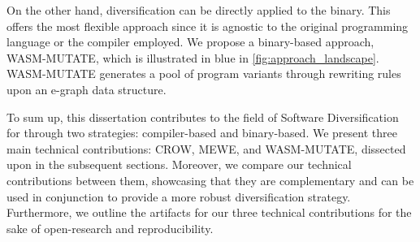 On the other hand, diversification can be directly applied to the \Wasm binary.
This offers the most flexible approach since it is agnostic to the original programming language or the compiler employed.
We propose a binary-based approach, WASM-MUTATE, which is illustrated in blue in \autoref{fig:approach_landscape}.
WASM-MUTATE \cite{wasmmutate} generates a pool of \Wasm program variants through rewriting rules upon an e-graph \cite{e-graph} data structure.


To sum up, this dissertation contributes to the field of Software Diversification for \Wasm through two strategies: compiler-based and binary-based.
We present three main technical contributions: CROW, MEWE, and WASM-MUTATE, dissected upon in the subsequent sections.
Moreover, we compare our technical contributions between them, showcasing that they are complementary and can be used in conjunction to provide a more robust diversification strategy.
Furthermore, we outline the artifacts for our three technical contributions for the sake of open-research and reproducibility.

